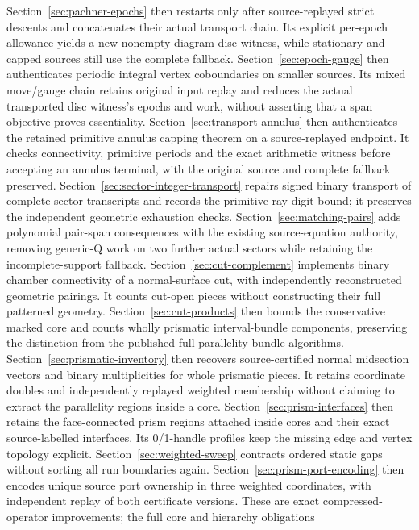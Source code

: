 \documentclass[11pt]{article}
\theoremstyle{remark}
\begin{document}
Section~\ref{sec:pachner-epochs} then restarts only after source-replayed
strict descents and concatenates their actual transport chain. Its explicit
per-epoch allowance yields a new nonempty-diagram disc witness, while
stationary and capped sources still use the complete fallback.
Section~\ref{sec:epoch-gauge} then authenticates periodic integral vertex
coboundaries on smaller sources. Its mixed move/gauge chain retains original
input replay and reduces the actual transported disc witness's epochs and
work, without asserting that a span objective proves essentiality.
Section~\ref{sec:transport-annulus} then authenticates the retained primitive
annulus capping theorem on a source-replayed endpoint. It checks connectivity,
primitive periods and the exact arithmetic witness before accepting an
annulus terminal, with the original source and complete fallback preserved.
Section~\ref{sec:sector-integer-transport} repairs signed binary transport
of complete sector transcripts and records the primitive ray digit bound;
it preserves the independent geometric exhaustion checks.
Section~\ref{sec:matching-pairs} adds polynomial pair-span consequences
with the existing source-equation authority, removing generic-Q work on
two further actual sectors while retaining the incomplete-support fallback.
Section~\ref{sec:cut-complement} implements binary chamber connectivity
of a normal-surface cut, with independently reconstructed geometric pairings.
It counts cut-open pieces without constructing their full patterned geometry.
Section~\ref{sec:cut-products} then bounds the conservative marked core and
counts wholly prismatic interval-bundle components, preserving the distinction
from the published full parallelity-bundle algorithms.
Section~\ref{sec:prismatic-inventory} then recovers source-certified normal
midsection vectors and binary multiplicities for whole prismatic pieces.
It retains coordinate doubles and independently replayed weighted membership
without claiming to extract the parallelity regions inside a core.
Section~\ref{sec:prism-interfaces} then retains the face-connected prism
regions attached inside cores and their exact source-labelled interfaces.
Its 0/1-handle profiles keep the missing edge and vertex topology explicit.
Section~\ref{sec:weighted-sweep} contracts ordered static gaps without
sorting all run boundaries again. Section~\ref{sec:prism-port-encoding}
then encodes unique source port ownership in three weighted coordinates,
with independent replay of both certificate versions. These are exact
compressed-operator improvements; the full core and hierarchy obligations
\end{document}
